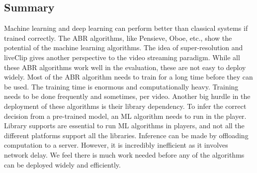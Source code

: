 \subsection{Summary}
Machine learning and deep learning can perform better than classical systems if trained correctly. The \ac{ABR} algorithms, like Pensieve, Oboe, etc., show the potential of the machine learning algorithms. The idea of super-resolution and liveClip gives another perspective to the video streaming paradigm. While all these \ac{ABR} algorithms work well in the evaluation, these are not easy to deploy widely. Most of the \ac{ABR} algorithm needs to train for a long time before they can be used. The training time is enormous and computationally heavy. Training needs to be done frequently and sometimes, per video. Another big hurdle in the deployment of these algorithms is their library dependency. To infer the correct decision from a pre-trained model, an \ac{ML} algorithm needs to run in the player. Library supports are essential to run \ac{ML} algorithms in players, and not all the different platforms support all the libraries. Inference can be made by offloading computation to a server. However, it is incredibly inefficient as it involves network delay. We feel there is much work needed before any of the algorithms can be deployed widely and efficiently.

